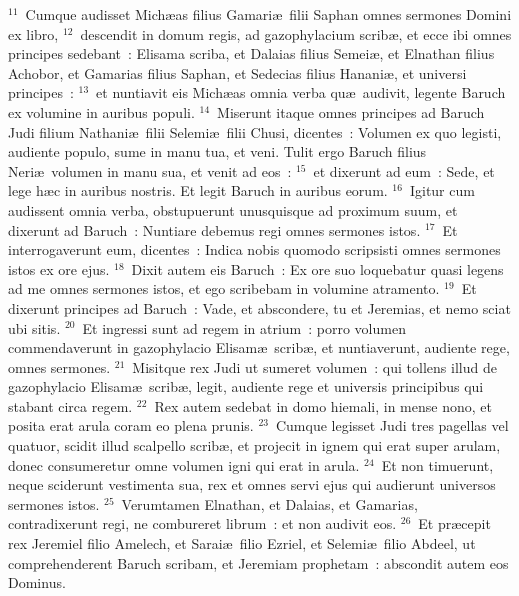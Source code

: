 ${}^{11}$~Cumque audisset Mich\ae as filius Gamari\ae\ filii Saphan omnes sermones Domini ex libro,
${}^{12}$~descendit in domum regis, ad gazophylacium scrib\ae , et ecce ibi omnes principes sedebant~: Elisama scriba, et Dalaias filius Semei\ae , et Elnathan filius Achobor, et Gamarias filius Saphan, et Sedecias filius Hanani\ae , et universi principes~:
${}^{13}$~et nuntiavit eis Mich\ae as omnia verba qu\ae\ audivit, legente Baruch ex volumine in auribus populi.
${}^{14}$~Miserunt itaque omnes principes ad Baruch Judi filium Nathani\ae\ filii Selemi\ae\ filii Chusi, dicentes~: Volumen ex quo legisti, audiente populo, sume in manu tua, et veni. Tulit ergo Baruch filius Neri\ae\ volumen in manu sua, et venit ad eos~:
${}^{15}$~et dixerunt ad eum~: Sede, et lege h\ae c in auribus nostris. Et legit Baruch in auribus eorum.
${}^{16}$~Igitur cum audissent omnia verba, obstupuerunt unusquisque ad proximum suum, et dixerunt ad Baruch~: Nuntiare debemus regi omnes sermones istos.
${}^{17}$~Et interrogaverunt eum, dicentes~: Indica nobis quomodo scripsisti omnes sermones istos ex ore ejus.
${}^{18}$~Dixit autem eis Baruch~: Ex ore suo loquebatur quasi legens ad me omnes sermones istos, et ego scribebam in volumine atramento.
${}^{19}$~Et dixerunt principes ad Baruch~: Vade, et abscondere, tu et Jeremias, et nemo sciat ubi sitis.
${}^{20}$~Et ingressi sunt ad regem in atrium~: porro volumen commendaverunt in gazophylacio Elisam\ae\ scrib\ae , et nuntiaverunt, audiente rege, omnes sermones.
${}^{21}$~Misitque rex Judi ut sumeret volumen~: qui tollens illud de gazophylacio Elisam\ae\ scrib\ae , legit, audiente rege et universis principibus qui stabant circa regem.
${}^{22}$~Rex autem sedebat in domo hiemali, in mense nono, et posita erat arula coram eo plena prunis.
${}^{23}$~Cumque legisset Judi tres pagellas vel quatuor, scidit illud scalpello scrib\ae , et projecit in ignem qui erat super arulam, donec consumeretur omne volumen igni qui erat in arula.
${}^{24}$~Et non timuerunt, neque sciderunt vestimenta sua, rex et omnes servi ejus qui audierunt universos sermones istos.
${}^{25}$~Verumtamen Elnathan, et Dalaias, et Gamarias, contradixerunt regi, ne combureret librum~: et non audivit eos.
${}^{26}$~Et pr\ae cepit rex Jeremiel filio Amelech, et Sarai\ae\ filio Ezriel, et Selemi\ae\ filio Abdeel, ut comprehenderent Baruch scribam, et Jeremiam prophetam~: abscondit autem eos Dominus.


